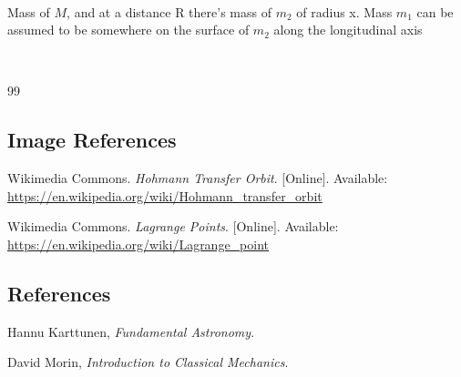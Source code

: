 \documentclass[10pt, a4paper]{article}
\begin{document}
\begin{center}
    
\\[1EM]
Mass of $M$, and at a distance R there's mass of $m_2$ of radius x. Mass $m_1$ can be assumed to be somewhere on the surface of $m_2$ along the longitudinal axis


\\[2EM]

\end{center}
\begin{thebibliography}{99}

    \subsection*{Image References}

    Wikimedia Commons.
    \textit{Hohmann Transfer Orbit}.
    [Online]. Available:
    \url{https://en.wikipedia.org/wiki/Hohmann_transfer_orbit}

    Wikimedia Commons.
    \textit{Lagrange Points}.
    [Online]. Available:
    \url{https://en.wikipedia.org/wiki/Lagrange_point}

    \subsection*{References}

    Hannu Karttunen,
    \textit{Fundamental Astronomy}.
    

    David Morin,
    \textit{Introduction to Classical Mechanics}.
   

\end{thebibliography}
\end{document}

